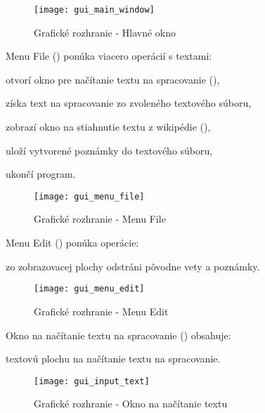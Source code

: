 \begin{figure}[H]
	\begin{center}\texttt{[image: gui\_main\_window]}\end{center}
	\caption[Grafické rozhranie - Hlavné okno]{Grafické rozhranie - Hlavné okno}\label{appendix:gui:main_window}
\end{figure}

Menu File () ponúka viacero operácií s textami:
\begin{my_enumerate}
	\item otvorí okno pre načítanie textu na spracovanie (),
	\item získa text na spracovanie zo zvoleného textového súboru,
	\item zobrazí okno na stiahnutie textu z wikipédie (),
	\item uloží vytvorené poznámky do textového súboru,
	\item ukončí program.
\end{my_enumerate}

\begin{figure}[H]
	\begin{center}\texttt{[image: gui\_menu\_file]}\end{center}
	\caption[Grafické rozhranie - Menu File]{Grafické rozhranie - Menu File}\label{appendix:gui:menu_file}
\end{figure}

Menu Edit () ponúka operácie:
\begin{my_enumerate}
	\item zo zobrazovacej plochy odstráni pôvodne vety a poznámky.
\end{my_enumerate}

\begin{figure}[H]
	\begin{center}\texttt{[image: gui\_menu\_edit]}\end{center}
	\caption[Grafické rozhranie - Menu Edit]{Grafické rozhranie - Menu Edit}\label{appendix:gui:menu_edit}
\end{figure}

Okno na načítanie textu na spracovanie () obsahuje:
\begin{my_enumerate}
	\item textovú plochu na načítanie textu na spracovanie.
\end{my_enumerate}
\begin{figure}[H]
	\begin{center}\texttt{[image: gui\_input\_text]}\end{center}
	\caption[Grafické rozhranie - Okno na načítanie textu]{Grafické rozhranie - Okno na načítanie textu}\label{appendix:gui:input_window}
\end{figure}

